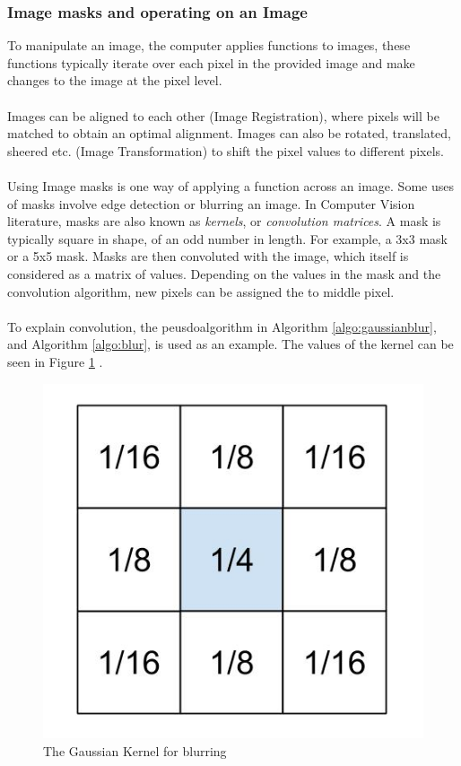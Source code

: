 \documentclass[11pt]{article}
\begin{document}
\subsubsection{Image masks and operating on an Image}
To manipulate an image, the computer applies functions to images,
these functions typically iterate over each pixel in the provided image and
make changes to the image at the pixel level.\\
\\
Images can be aligned to each other (Image Registration), where pixels
will be matched to obtain an optimal alignment. Images can also
be rotated, translated, sheered etc. (Image Transformation) to shift
the pixel values to different pixels. \\
\\
Using Image masks is one way of applying a function across an image.
Some uses of masks involve edge detection or blurring an image. In
Computer Vision literature, masks are also known as \textit{kernels},
or \textit{convolution matrices}. A mask is typically square in shape,
of an odd number in length. For example, a 3x3 mask or a 5x5 mask. 
Masks are then convoluted with the image, which itself is considered as
a matrix of values. Depending on the values in the mask and the convolution
algorithm, new pixels can be assigned the to middle pixel.\\
\\
To explain convolution, the peusdoalgorithm in Algorithm 
\ref{algo:gaussianblur}, and Algorithm \ref{algo:blur}, is used as an example.
The values of the kernel can be seen in Figure \ref{fig:gaussiankernel} .

\begin{figure}
	\centering
	\includegraphics[scale=0.3]{pics/gaussiankernel.jpg}
	\caption{The Gaussian Kernel for blurring}
	\label{fig:gaussiankernel}
\end{figure}
\end{document}

